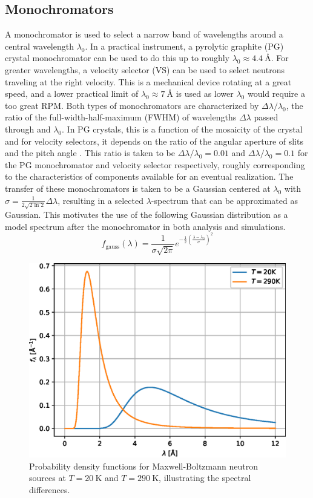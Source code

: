 \subsection{Monochromators}
A monochromator is used to select a narrow band of wavelengths around a central wavelength $\lambda_0$. In a practical instrument, a pyrolytic graphite (PG) crystal monochromator can be used to do this up to roughly $\lambda_0 \approx \SI{4.4}{\angstrom}$. For greater wavelengths, a velocity selector (VS) can be used to select neutrons traveling at the right velocity. This is a mechanical device rotating at a great speed, and a lower practical limit of $\lambda_0 \approx \SI{7}{\angstrom}$ is used as lower $\lambda_0$ would require a too great RPM. Both types of monochromators are characterized by $\Delta\lambda/\lambda_0$, the ratio of the full-width-half-maximum (FWHM) of wavelengths $\Delta\lambda$ passed through and $\lambda_0$. In PG crystals, this is a function of the mosaicity of the crystal \cite{shapiro1972} and for velocity selectors, it depends on the ratio of the angular aperture of slits and the pitch angle \cite{szewc2010}. This ratio is taken to be $\Delta\lambda/\lambda_0 = 0.01$ and $\Delta\lambda/\lambda_0 = 0.1$ for the PG monochromator and velocity selector respectively, roughly corresponding to the characteristics of components available for an eventual realization. The transfer of these monochromators is taken to be a Gaussian centered at $\lambda_0$ with $\sigma = \frac{1}{2\sqrt{2\ln 2}}\Delta\lambda$, resulting in a selected $\lambda$-spectrum that can be approximated as Gaussian. This motivates the use of the following Gaussian distribution as a model spectrum after the monochromator in both analysis and simulations.
\begin{equation}
	f_\text{gauss}(\lambda) = \frac{1}{\sigma\sqrt{2\pi}} e^{-\frac{1}{2}(\frac{\lambda - \lambda_0}{\sigma})^2} \label{eq:gauss-spectrum}
\end{equation}
\begin{figure}
	\centering
	\includegraphics[width=0.5\linewidth]{source-spectrum}
	\caption{Probability density functions for Maxwell-Boltzmann neutron sources at $T = \SI{20}{\kelvin}$ and $T = \SI{290}{\kelvin}$, illustrating the spectral differences. }
	\label{fig:source-spectrum}
\end{figure}
